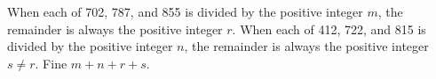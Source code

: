 When each of 702, 787, and 855 is divided by the positive integer $m$, the remainder is always the positive integer $r$. When each of 412, 722, and 815 is divided by the positive integer $n$, the remainder is always the positive integer $s \neq r$. Fine $m+n+r+s$.